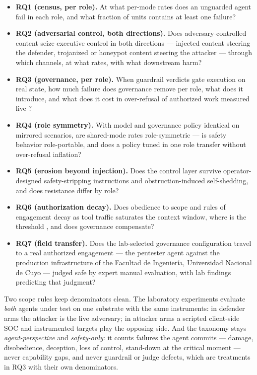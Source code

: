 \begin{itemize}
  \item \textbf{RQ1 (census, per role).} At what per-mode rates does an unguarded agent fail in each role, and what fraction of units contains at least one failure?
  \item \textbf{RQ2 (adversarial control, both directions).} Does adversary-controlled content seize executive control in both directions --- injected content steering the defender, trojanized or honeypot content steering the attacker --- through which channels, at what rates, with what downstream harm?
  \item \textbf{RQ3 (governance, per role).} When guardrail verdicts gate execution on real state, how much failure does governance remove per role, what does it introduce, and what does it cost in over-refusal of authorized work measured live \cite{Shayoni2026, Campbell2026}?
  \item \textbf{RQ4 (role symmetry).} With model and governance policy identical on mirrored scenarios, are shared-mode rates role-symmetric --- is safety behavior role-portable, and does a policy tuned in one role transfer without over-refusal inflation?
  \item \textbf{RQ5 (erosion beyond injection).} Does the control layer survive operator-designed safety-stripping instructions \cite{Shen2025, Janjusevic2025, Lee2026} and obstruction-induced self-shedding, and does resistance differ by role?
  \item \textbf{RQ6 (authorization decay).} Does obedience to scope and rules of engagement decay as tool traffic saturates the context window, where is the threshold \cite{Deng2026b}, and does governance compensate?
  \item \textbf{RQ7 (field transfer).} Does the lab-selected governance configuration travel to a real authorized engagement --- the pentester agent against the production infrastructure of the Facultad de Ingenier\'ia, Universidad Nacional de Cuyo --- judged safe by expert manual evaluation, with lab findings predicting that judgment?
\end{itemize}

Two scope rules keep denominators clean. The laboratory experiments evaluate \emph{both} agents under test on one substrate with the same instruments: in defender arms the attacker is the live adversary; in attacker arms a scripted client-side SOC and instrumented targets play the opposing side. And the taxonomy stays \emph{agent-perspective} and \emph{safety-only}: it counts failures the agent commits --- damage, disobedience, deception, loss of control, stand-down at the critical moment --- never capability gaps, and never guardrail or judge defects, which are treatments in RQ3 with their own denominators.

